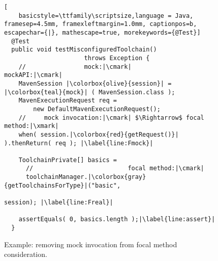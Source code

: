 \begin{figure}[h]
	\begin{lstlisting}[
	basicstyle=\ttfamily\scriptsize,language = Java, framesep=4.5mm, framexleftmargin=1.0mm, captionpos=b, escapechar={|}, mathescape=true, morekeywords={@Test}]
  @Test
  public void testMisconfiguredToolchain() 
                      throws Exception {
    //                mock:|\cmark|         mockAPI:|\cmark|
    MavenSession |\colorbox{olive}{session}| = |\colorbox{teal}{mock}| ( MavenSession.class );
    MavenExecutionRequest req =
        new DefaultMavenExecutionRequest();
    //     mock invocation:|\cmark| $\Rightarrow$ focal method:|\xmark|
    when( session.|\colorbox{red}{getRequest()}| ).thenReturn( req ); |\label{line:Fmock}|

    ToolchainPrivate[] basics =
      //                          focal method:|\cmark|
      toolchainManager.|\colorbox{gray}{getToolchainsForType}|("basic", 
                                                           session); |\label{line:Freal}|

    assertEquals( 0, basics.length );|\label{line:assert}|
  }
  \end{lstlisting}

  \caption{Example: removing mock invocation from focal method consideration.}
  \label{fig:mockExampleEvaluation}
\end{figure}
